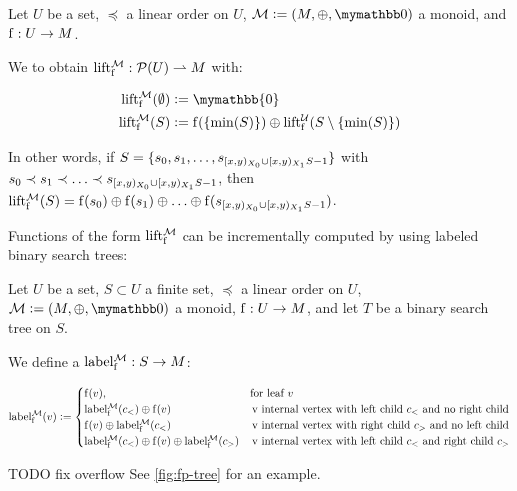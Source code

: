\begin{definition}
\label{def-lift}
Let $U$ be a set, $\preceq$ a linear order on $U$, $\mathcal{M} \defeq (M, \groupaddsym, \neutraladd)$ a monoid, and ${\operatorname{f}}: {U} \rightarrow {M}$.

We  to obtain ${\operatorname{lift_{\operatorname{f}}^{\mathcal{M}}}}: {\mathcal{P}({U})} \rightharpoonup{M}$ with:

\begin{align*}
\lift{\f}{\mathcal{M}}(\emptyset) &\defeq \mymathbb{0}\\
\lift{\f}{\mathcal{M}}(S) &\defeq \f(\set{\min(S)}) \oplus \lift{\f}{\mathcal{U}}(S \setminus \set{\min(S)})\\
\end{align*}

In other words, if $S = \{s_0, s_1, \ldots, s_{[{x},{y})_{X_0} \cup [{x},{y})_{X_1}{S} - 1}\}$ with $s_0 \prec s_1 \prec \ldots \prec s_{[{x},{y})_{X_0} \cup [{x},{y})_{X_1}{S} - 1}$, then $\operatorname{lift_{\operatorname{f}}^{\mathcal{M}}}(S) = {\operatorname{f}(s_0)} \oplus {{\operatorname{f}(s_1)} \oplus{{\ldots} \oplus{\operatorname{f}(s_{[{x},{y})_{X_0} \cup [{x},{y})_{X_1}{S} - 1})}}}$.
\end{definition}

Functions of the form $\operatorname{lift_{\operatorname{f}}^{\mathcal{M}}}$ can be incrementally computed by using labeled binary search trees:

\begin{definition}
Let $U$ be a set, $S \subset U$ a finite set, $\preceq$ a linear order on $U$, $\mathcal{M} \defeq (M, \groupaddsym, \neutraladd)$ a monoid, ${\operatorname{f}}: {U} \rightarrow {M}$, and let $T$ be a binary search tree on $S$.

We define a  ${\operatorname{label_{\operatorname{f}}^{\mathcal{M}}}}: {S} \rightarrow {M}$:

  \[
   \operatorname{label_{\operatorname{f}}^{\mathcal{M}}}(v) \vcentcolon= \begin{cases}
\operatorname{f}(v), &  \text{for leaf $v$} \\
{\operatorname{label_{\operatorname{f}}^{\mathcal{M}}}(c_{<})} \oplus {\operatorname{f}(v)} & \, \text{v internal vertex with left child $c_{<}$ and no right child}\\
{\operatorname{f}(v)} \oplus {\operatorname{label_{\operatorname{f}}^{\mathcal{M}}}(c_{<})} & \, \text{v internal vertex with right child $c_{>}$ and no left child}\\
{\operatorname{label_{\operatorname{f}}^{\mathcal{M}}}(c_{<})} \oplus {{\operatorname{f}(v)} \oplus{\operatorname{label_{\operatorname{f}}^{\mathcal{M}}}(c_{>})}} & \, \text{v internal vertex with left child $c_{<}$ and right child $c_{>}$}
\end{cases}
  \]

TODO fix overflow
See \cref{fig:fp-tree} for an example.
\end{definition}

